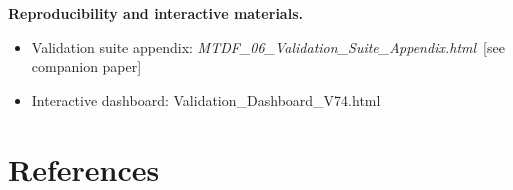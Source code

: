\documentclass[11pt,a4paper]{article}
\begin{document}
\begin{mdframed}[linecolor=accent,linewidth=0.5pt,backgroundcolor=callout-bg,leftline=true,rightline=true,topline=true,bottomline=true,innerleftmargin=8pt,innerrightmargin=8pt,innertopmargin=6pt,innerbottommargin=6pt]
\textbf{Reproducibility and interactive materials.}\begin{itemize}
  \item Validation suite appendix: \textit{MTDF\_\allowbreak{}06\_\allowbreak{}Validation\_\allowbreak{}Suite\_\allowbreak{}Appendix.html}~[see companion paper]
  \item Interactive dashboard: Validation\_\allowbreak{}Dashboard\_\allowbreak{}V74.html
\end{itemize}
\end{mdframed}

\section{References}
\end{document}
